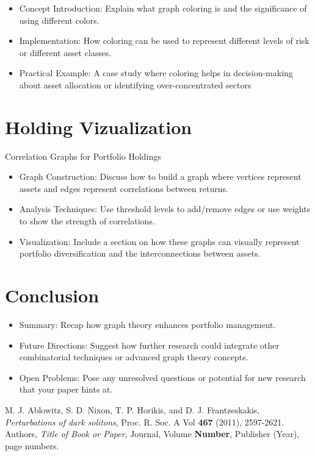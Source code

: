 \documentclass{article}
\begin{document}
\begin{itemize}
    \item Concept Introduction: Explain what graph coloring is and the significance of using different colors.
    \item Implementation: How coloring can be used to represent different levels of risk or different asset classes.
    \item Practical Example: A case study where coloring helps in decision-making about asset allocation or identifying over-concentrated sectors
\end{itemize}


\section{Holding Vizualization}

Correlation Graphs for Portfolio Holdings

\begin{itemize}
    \item Graph Construction: Discuss how to build a graph where vertices represent assets and edges represent correlations between returns.
    \item Analysis Techniques: Use threshold levels to add/remove edges or use weights to show the strength of correlations.
    \item Visualization: Include a section on how these graphs can visually represent portfolio diversification and the interconnections between assets.
\end{itemize}


\section{Conclusion}

\begin{itemize}
    \item Summary: Recap how graph theory enhances portfolio management.
    \item Future Directions: Suggest how further research could integrate other combinatorial techniques or advanced graph theory concepts.
    \item Open Problems: Pose any unresolved questions or potential for new research that your paper hints at.
\end{itemize}



\begin{thebibliography}{99}
    M. J. Ablowitz, S. D. Nixon, T. P. Horikis, and D. J. Frantzeskakis, \emph{Perturbations of dark solitons}, Proc. R. Soc. A Vol \textbf{467} (2011), 2597-2621.
    Authors, \emph{Title of Book or Paper}, Journal, Volume \textbf{Number}, Publisher (Year), page numbers.
\end{thebibliography}
\end{document}
